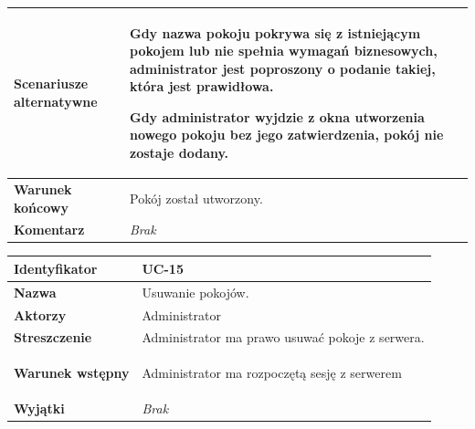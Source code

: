 {\begin{tabular}{ | l | l | }
	\hline
		\textbf{Scenariusze alternatywne} & \parbox[t]
		{11cm}{
			\begin{enumreq}
				\item Gdy nazwa pokoju pokrywa się z istniejącym pokojem lub nie spełnia
				wymagań biznesowych, administrator jest poproszony o podanie takiej,
				która jest prawidłowa.
				\item Gdy administrator wyjdzie z okna utworzenia nowego pokoju bez
				jego zatwierdzenia, pokój nie zostaje dodany.
			\end{enumreq}
		}
		\\

	\hline
		\textbf{Warunek końcowy} & \parbox[t]{11cm}{
			Pokój został utworzony.
		}
		\\

	\hline
		\textbf{Komentarz} & \parbox[t]{11cm}{
			\textit{Brak}
		}
		\\

	\hline
\end{tabular}

\vspace{2em}

\begin{tabular}{ | l | l | }
	\hline
		\textbf{Identyfikator} &
		UC-15
		\\

	\hline
		\textbf{Nazwa} &
		Usuwanie pokojów.
		\\

	\hline
		\textbf{Aktorzy} & \parbox[t]{11cm}{
			Administrator
		}\\

	\hline
		\textbf{Streszczenie} & \parbox[t]{11cm}{
			Administrator ma prawo usuwać pokoje z serwera.

		}\\

	\hline
		\textbf{Warunek wstępny} & \parbox[t]{11cm}{
			\begin{enumreq}
				\item Administrator ma rozpoczętą sesję z serwerem
			\end{enumreq}

		}
		\\

	\hline
		\textbf{Wyjątki} & \parbox[t]{11cm}{
			\textit{Brak}

		}
		\\


\end{tabular}}
